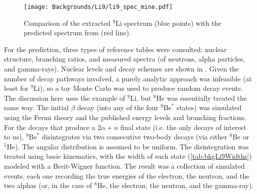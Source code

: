 \documentclass[../thesis.tex]{subfiles}
\begin{document}
\begin{figure}[h]
  \texttt{[image: Backgrounds/Li9/li9\_spec\_mine.pdf]}
  \caption{Comparison of the extracted $^9$Li spectrum (blue points) with the predicted spectrum from \cite{pedroLi9Spec1,pedroLi9Spec2} (red line).}
  \label{fig:li9_spec}
\end{figure}

\begin{comment}
An extraction of the spectrum from Daya Bay data was performed by Marshall in [YYY]. The approach takes advantage of the fact that \LiHe\ are essentially the only IBD-like events that are correlated with muons on the 100~ms timescale. A \LiHe-enriched sample was obtained by taking IBD-like events within 2---200~ms of a ``shower'' muon, here defined as one producing at least $2\times10^5$ photoelectrons. This sample contained various muon-uncorrelated ``backgrounds'', such as true IBDs and accidentals. In order to remove this contamination, a \LiHe-depleted sample was obtained by looking for IBD candidates with no preceding shower muons within 1.5~s. Before subtracting the two spectra, an appropriate normalization for the depleted sample had to be determined. This was done by performing the time-to-last-muon fit for the enriched sample, which indicated the number of true \LiHe\ events in the sample, in turn implying the number of non-\LiHe\ events. The depleted sample was thus normalized to this latter count, and the subtraction was performed, giving the results shown in Fig.~YYY.
\end{comment}

For the prediction, three types of reference tables were consulted: nuclear structure, branching ratios, and measured spectra (of neutrons, alpha particles, and gamma-rays). Nuclear levels and decay schemes are shown in . Given the number of decay pathways involved, a purely analytic approach was infeasible (at least for $^9$Li), so a toy Monte Carlo was used to produce random decay events. The discussion here uses the example of $^9$Li, but $^8$He was essentially treated the same way. The initial $\beta$ decay (into any of the four $^9\mathrm{Be}^*$ states) was simulated using the Fermi theory \cite{Fermi1934TentativoDU} and the published energy levels and branching fractions. For the decays that produce a $2\alpha+n$ final state (i.e. the only decays of interest to us), $^9\mathrm{Be}^*$ disintegrates via two consecutive two-body decays (via either $^8$Be or $^5$He). The angular distribution is assumed to be uniform. The disintegration was treated using basic kinematics, with the width of each state (\autoref{tab:bkgLi9Widths}) modeled with a Breit-Wigner function. The result was a collection of simulated events, each one recording the true energies of the electron, the neutron, and the two alphas (or, in the case of $^8$He, the electron, the neutron, and the gamma-ray).
\end{document}
